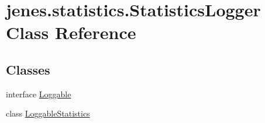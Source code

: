 \hypertarget{classjenes_1_1statistics_1_1_statistics_logger}{\section{jenes.\-statistics.\-Statistics\-Logger Class Reference}
\label{classjenes_1_1statistics_1_1_statistics_logger}
}
\subsection*{Classes}
\begin{DoxyCompactItemize}
\item 
interface \hyperlink{interfacejenes_1_1statistics_1_1_statistics_logger_1_1_loggable}{Loggable}
\item 
class \hyperlink{classjenes_1_1statistics_1_1_statistics_logger_1_1_loggable_statistics}{Loggable\-Statistics}
\end{DoxyCompactItemize}
